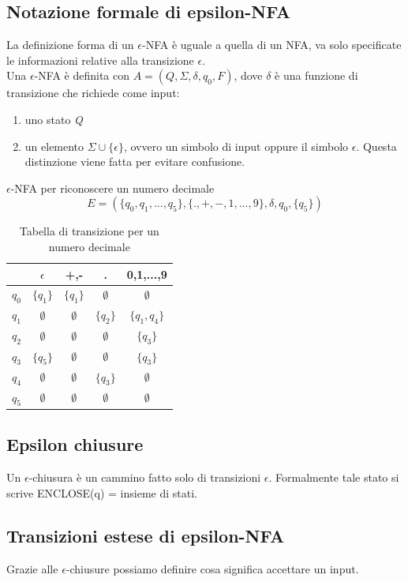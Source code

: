 \documentclass[12pt]{article}
\begin{document}
\newpage
\subsection{Notazione formale di epsilon-NFA}
La definizione forma di un $\epsilon$-NFA è uguale a quella di un NFA, va solo specificate le informazioni relative alla transizione $\epsilon$.
\\ Una $\epsilon$-NFA è definita con $A = (Q, \Sigma, \delta, q_0, F)$, dove $\delta$ è una funzione di transizione che richiede come input: 
\begin{enumerate}
  \item uno stato \emph{Q}
  \item un elemento $\Sigma \cup \{\epsilon\}$, ovvero un simbolo di input oppure il simbolo $\epsilon$. Questa distinzione viene fatta per evitare confusione. 
\end{enumerate}

$\epsilon$-NFA per riconoscere un numero decimale
\[ E = (\{q_0,q_1,...,q_5\}, \{.,+,-,1,...,9\},\delta, q_0, \{q_5\})\]

\begin{table}[ht]
\centering
\begin{tabular}{c || c | c | c | c}
& $\epsilon$ & +,- & . & 0,1,...,9 \\
\hline \hline
  $q_0$ & $\{q_1\}$ & $\{q_1\}$ & $\emptyset$ & $\emptyset$ \\
$q_1$ & $\emptyset$ & $\emptyset$ & $\{q_2\}$ & $\{q_1, q_4\}$ \\
$q_2$ & $\emptyset$ & $\emptyset$ & $\emptyset$ & $\{q_3\}$ \\
$q_3$ & $\{q_5\}$ & $\emptyset$ & $\emptyset$ & $\{q_3\}$ \\
$q_4$ & $\emptyset$ & $\emptyset$ & $\{q_3\}$ & $\emptyset$ \\
$q_5$ & $\emptyset$ & $\emptyset$ & $\emptyset$ & $\emptyset$ \\
\end{tabular}
\caption{Tabella di transizione per un numero decimale}
\end{table}

\subsection{Epsilon chiusure}
Un $\epsilon$-chiusura è un cammino fatto solo di transizioni $\epsilon$. Formalmente tale stato si scrive ENCLOSE(q) = {insieme di stati.}

\subsection{Transizioni estese di epsilon-NFA}
Grazie alle $\epsilon$-chiusure possiamo definire cosa significa accettare un input.
\end{document}
